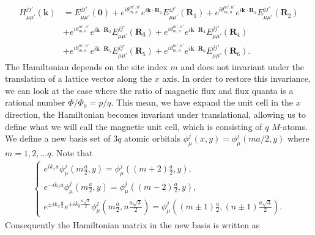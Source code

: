 \documentclass{report}
\begin{document}
\begin{equation}
	\begin{aligned}
		H_{\mu\mu'}^{jj'}(\mathbf{k})
		 & = E_{\mu\mu'}^{jj'}(\mathbf{0}) + e^{i\theta_{m,n}^{m',n'} }e^{i \mathbf{k} \cdot \mathbf{R}_{1}} E_{\mu\mu'}^{jj'}(\mathbf{R}_{1}) + e^{i\theta_{m,n}^{m',n'} } e^{i \mathbf{k} \cdot \mathbf{R}_{2}} E_{\mu\mu'}^{jj'}(\mathbf{R}_{2}) \\
		 & + e^{i\theta_{m,n}^{m',n'} } e^{i \mathbf{k} \cdot \mathbf{R}_{3}} E_{\mu\mu'}^{jj'}(\mathbf{R}_{3}) + e^{i\theta_{m,n}^{m',n'} }e^{i \mathbf{k} \cdot \mathbf{R}_{4}} E_{\mu\mu'}^{jj'}(\mathbf{R}_{4})                                 \\
		 & + e^{i\theta_{m,n}^{m',n'} } e^{i \mathbf{k} \cdot \mathbf{R}_{5}} E_{\mu\mu'}^{jj'}(\mathbf{R}_{5}) + e^{i\theta_{m,n}^{m',n'} }e^{i \mathbf{k} \cdot \mathbf{R}_{6}} E_{\mu\mu'}^{jj'}(\mathbf{R}_{6}).
	\end{aligned}
\end{equation}
The Hamiltonian depends on the site index $m$ and does not invariant under the translation of a lattice vector along the $x$ axis. In order to restore this invariance, we can look at the case where the ratio of magnetic flux and flux quanta is a rational number $\Phi / \Phi_{0} = p / q$. This mean, we have expand the unit cell in the $x$ direction, the Hamiltonian becomes invariant under translational, allowing us to define what we will call the magnetic unit cell, which is consisting of $q$ $M$-atoms. %
We define a new basis set of $3q$ atomic orbitals $\phi_{\mu}^{j} (x,y) = \phi_{\mu}^{j} (ma/2,y)$ where $m = 1,2,...q$. Note that
\begin{gather}
	\begin{cases}
		e^{i k_{x} a} \phi_{\mu}^{j} \left(m \frac{a}{2},y\right) = \phi_{\mu}^{j} \left((m+2)\frac{a}{2},y\right), \\
		e^{-i k_{x} a} \phi_{\mu}^{j} \left(m\frac{a}{2},y\right) = \phi_{\mu}^{j} \left((m-2)\frac{a}{2},y\right) ,\\
		e^{\pm i k_{x} \frac{a}{2}} e^{\pm i k_{y} \frac{a\sqrt{3}}{2}} \phi_{\mu}^{j} \left(m \frac{a}{2},n \frac{a\sqrt{3}}{2}\right) = \phi_{\mu}^{j} \left((m \pm 1)\frac{a}{2},(n \pm 1)\frac{a\sqrt{3}}{2}\right).
	\end{cases}
\end{gather}
Consequently the Hamiltonian matrix in the new basis is written as
\end{document}
